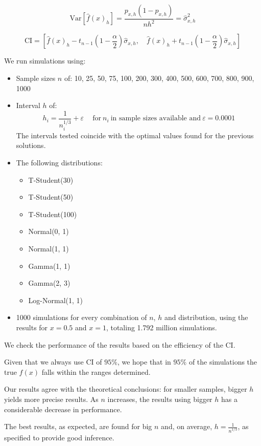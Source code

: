 \documentclass{article}
\begin{document}
$$
\text{Var}[\hat{f}(x)_h] = \frac{p_{x, h} (1 - p_{x, h})}{n h^2} = \hat{\sigma}^2_{x, h}
$$

$$
\text{CI} = \left[
  \hat{f}(x)_h - t_{n-1}\left(1 - \frac{\alpha}{2}\right) \hat{\sigma}_{x, h},
  \quad \hat{f}(x)_h + t_{n-1}\left(1 - \frac{\alpha}{2}\right) \hat{\sigma}_{x, h}
\right]
$$

We run simulations using:
\begin{itemize}
  \item Sample sizes $n$ of: 10, 25, 50, 75, 100, 200, 300, 400, 500, 600, 700, 800, 900, 1000
  \item Interval $h$ of:
  $$
  h_i = \frac{1}{n_i^{1/3}} + \varepsilon \quad \ \text{for} \ n_i \ \text{in sample sizes available and} \ \varepsilon = 0.0001 
  $$
  The intervals tested coincide with the optimal values found for the previous solutions.
  \item The following distributions:
  \begin{itemize}
    \item T-Student(30)
    \item T-Student(50)
    \item T-Student(100)
    \item Normal(0, 1)
    \item Normal(1, 1)
    \item Gamma(1, 1)
    \item Gamma(2, 3)
    \item Log-Normal(1, 1)
  \end{itemize}
  \item 1000 simulations for every combination of $n$, $h$ and distribution, using the results for $x = 0.5$ and $x = 1$, totaling 1.792 million simulations.
\end{itemize}

We check the performance of the results based on the efficiency of the CI.

Given that we always use CI of $95\%$, we hope that in $95\%$ of the simulations the true $f(x)$ falls within the ranges determined.

Our results agree with the theoretical conclusions: for smaller samples, bigger $h$ yields more precise results. As $n$ increases, the results using bigger $h$ has a considerable decrease in performance.

The best results, as expected, are found for big $n$ and, on average, $h = \frac{1}{n^{1/3}}$, as specified to provide good inference.
\end{document}
